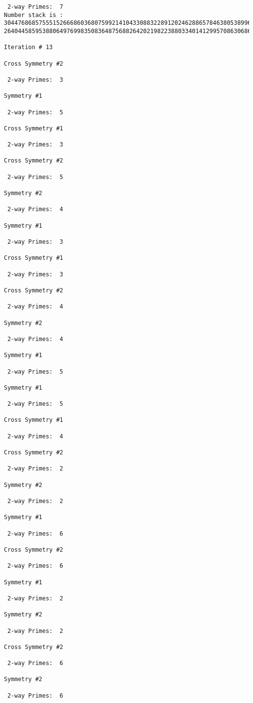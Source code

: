 {{{{\begin{verbatim}
 2-way Primes: 	7
Number stack is :
30447686857555152666860368075992141043308832289120246288657846380538996794608835958544046240163340857
26404458595388064976998350836487568826420219822388033401412995708630686662515557586867440375804336104

Iteration #	13

Cross Symmetry #2

 2-way Primes: 	3

Symmetry #1

 2-way Primes: 	5

Cross Symmetry #1

 2-way Primes: 	3

Cross Symmetry #2

 2-way Primes: 	5

Symmetry #2

 2-way Primes: 	4

Symmetry #1

 2-way Primes: 	3

Cross Symmetry #1

 2-way Primes: 	3

Cross Symmetry #2

 2-way Primes: 	4

Symmetry #2

 2-way Primes: 	4

Symmetry #1

 2-way Primes: 	5

Symmetry #1

 2-way Primes: 	5

Cross Symmetry #1

 2-way Primes: 	4

Cross Symmetry #2

 2-way Primes: 	2

Symmetry #2

 2-way Primes: 	2

Symmetry #1

 2-way Primes: 	6

Cross Symmetry #2

 2-way Primes: 	6

Symmetry #1

 2-way Primes: 	2

Symmetry #2

 2-way Primes: 	2

Cross Symmetry #2

 2-way Primes: 	6

Symmetry #2

 2-way Primes: 	6


\end{verbatim}}}}}
